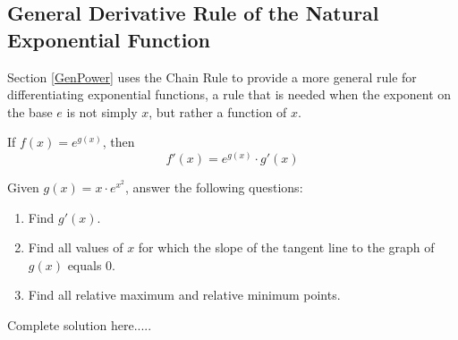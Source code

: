 \subsection*{General Derivative Rule of the Natural Exponential Function}
\noindent Section \ref{GenPower} uses the Chain Rule to provide a more general rule for differentiating exponential functions, a rule that is needed when the exponent on the base $e$ is not simply $x$, but rather a function of $x$.
\begin{tcolorbox}[title={Derivative of the Natural Exponential Function: General Rule}]
If $f(x)=e^{g(x)}$, then
\begin{equation}\label{eq:GenexpDerv}
    f'(x)=e^{g(x)}\cdot g'(x)
\end{equation}
\end{tcolorbox}
\begin{example}
Given $g(x)=x\cdot e^{x^2}$, answer the following questions:
\renewcommand{\labelenumi}{\textbf{(\alph{enumi})}}
\begin{enumerate}[leftmargin=*]
\item Find $g'(x)$.
\item Find all values of $x$ for which the slope of the tangent line to the graph of $g(x)$ equals 0.
\item Find all relative maximum and relative minimum points.
\end{enumerate}
    \begin{sol}
    \end{sol}
    \begin{solL}
    Complete solution here.....
    
    \end{solL}
    
\end{example}
\newpage
